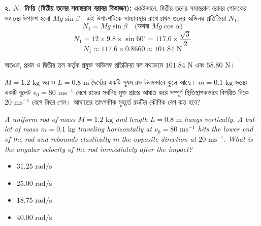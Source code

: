 \documentclass[12pt, a4paper]{article}
\begin{document}
{\begin{tcolorbox}[solutionbox={সমাধান (Solution)}]
\vspace{0.5em}
\textbf{২. $N_1$ নির্ণয় (দ্বিতীয় তলের সমান্তরাল বরাবর বিভাজন):}
একইভাবে, দ্বিতীয় তলের সমান্তরাল বরাবর গোলকের ওজনের উপাংশ হলো $Mg \sin\beta$। এই উপাংশটিকে সাম্যাবস্থায় রাখে প্রথম তলের অভিলম্ব প্রতিক্রিয়া $N_1$:
$$N_1 = Mg \sin\beta \quad \text{(অথবা } Mg \cos\alpha \text{)}$$
$$N_1 = 12 \times 9.8 \times \sin 60^\circ = 117.6 \times \frac{\sqrt{3}}{2}$$
$$N_1 \approx 117.6 \times 0.8660 \approx 101.84\text{ N}$$

অতএব, প্রথম ও দ্বিতীয় তল কর্তৃক প্রযুক্ত অভিলম্ব প্রতিক্রিয়া বল যথাক্রমে $101.84\text{ N}$ এবং $58.80\text{ N}$।
\end{tcolorbox}
\vspace{1em}
\begin{tcolorbox}[questionbox={প্রশ্ন (Question) 38}]
\noindent
$M = 1.2\text{ kg}$ ভর ও $L = 0.8\text{ m}$ দৈর্ঘ্যের একটি সুষম রড উলম্বভাবে ঝুলে আছে। $m = 0.1\text{ kg}$ ভরের একটি বুলেট $v_0 = 80\text{ ms}^{-1}$ বেগে রডের সর্বনিম্ন মুক্ত প্রান্তে আঘাত করে সম্পূর্ণ স্থিতিস্থাপকভাবে বিপরীত দিকে $20\text{ ms}^{-1}$ বেগে ফিরে গেল। আঘাতের তাৎক্ষণিক মুহূর্তে রডটির কৌণিক বেগ কত হবে?
\vspace{0.8em}
\begin{english}
\noindent\textit{\color{darkgray}
A uniform rod of mass $M = 1.2\text{ kg}$ and length $L = 0.8\text{ m}$ hangs vertically. A bullet of mass $m = 0.1\text{ kg}$ traveling horizontally at $v_0 = 80\text{ ms}^{-1}$ hits the lower end of the rod and rebounds elastically in the opposite direction at $20\text{ ms}^{-1}$. What is the angular velocity of the rod immediately after the impact?
}
\end{english}
\end{tcolorbox}

\begin{itemize}[label={}, leftmargin=1cm, itemsep=0.5em]
\item[\textbf{A)}] $31.25\text{ rad/s}$
\item[\textbf{B)}] $25.00\text{ rad/s}$
\item[\textbf{C)}] $18.75\text{ rad/s}$
\item[\textbf{D)}] $40.00\text{ rad/s}$
\end{itemize}
\vspace{0.5em}

}
\end{document}
